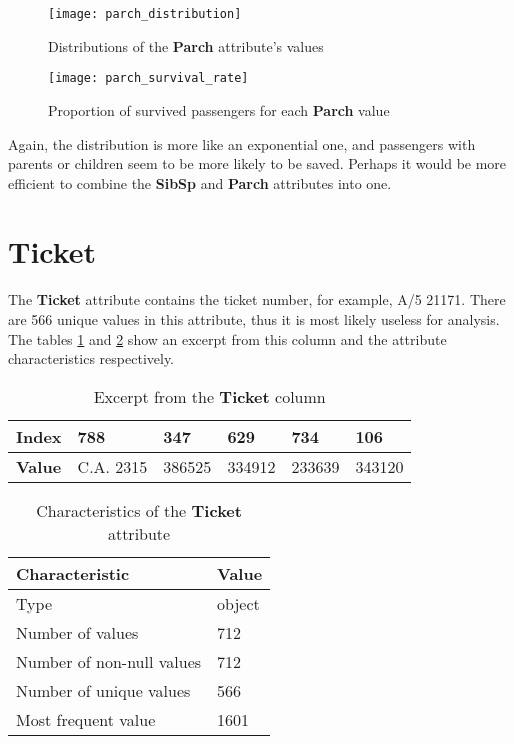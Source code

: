 \begin{figure}[!hp]
    \centering
    \texttt{[image: parch\_distribution]}
    \caption{Distributions of the \textbf{Parch} attribute's values}
    \label{pic:parch_distribution}
\end{figure}

\begin{figure}[!hp]
    \centering
    \texttt{[image: parch\_survival\_rate]}
    \caption{Proportion of survived passengers for each \textbf{Parch} value}
    \label{pic:parch_survival_rate}
\end{figure}

Again, the distribution is more like an exponential one, and passengers 
with parents or children seem to be more likely to be saved. Perhaps it 
would be more efficient to combine the \textbf{SibSp} and \textbf{Parch} 
attributes into one.


\section{Ticket} \label{section:Ticket}
The \textbf{Ticket} attribute contains the ticket number, for example, 
A/5 21171. There are 566 unique values in this attribute, thus it is most
likely useless for analysis. The tables \ref{table:ticket_head} and 
\ref{table:ticket_characteristics} show an excerpt from this column and 
the attribute characteristics respectively.

\begin{table}[!hp]
    \centering
    \caption{Excerpt from the \textbf{Ticket} column}
    \begin{tabular}{|l|l|l|l|l|l|}
        \hline
        \textbf{Index} & 788       & 347    & 629    & 734    & 106    \\ \hline
        \textbf{Value} & C.A. 2315 & 386525 & 334912 & 233639 & 343120 \\ \hline
    \end{tabular}
    \label{table:ticket_head}
\end{table}

\begin{table}[!hp]
    \centering
    \caption{Characteristics of the \textbf{Ticket} attribute}
    \begin{tabular}{|l|l|}
        \hline
        \textbf{Characteristic}   & \textbf{Value} \\ \hline
        Type                      & object         \\ \hline
        Number of values          & 712            \\ \hline
        Number of non-null values & 712            \\ \hline
        Number of unique values   & 566            \\ \hline
        Most frequent value       & 1601           \\ \hline
    \end{tabular}
    \label{table:ticket_characteristics}
\end{table}



